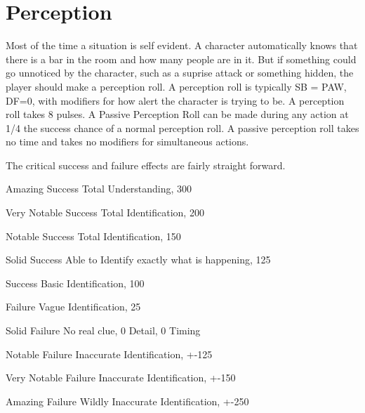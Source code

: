 \section{Perception}

Most of the time a situation is self evident. A character automatically
knows that there is a bar in the room and how many people are in it.
But if something could go unnoticed by the character, such as a suprise 
attack or something hidden, the player should make a {perception roll}. 
A perception roll is typically SB = PAW, DF=0, with modifiers for 
how alert the character is trying to be. A perception roll takes
8 pulses. A {Passive Perception Roll} can be made
during any action at 1/4 the success chance of a normal perception roll. A
passive perception roll takes no time and takes no modifiers for 
simultaneous actions.

The critical success and failure effects are fairly straight forward. 

\begin{description}
	\item Amazing Success
        Total Understanding, 300%

	\item Very Notable Success
        Total Identification, 200%

    \item Notable Success
        Total Identification, 150%

	\item Solid Success
        Able to Identify exactly what is happening, 125%

	\item Success
        Basic Identification, 100%

	\item Failure
        Vague Identification, 25%

	\item Solid Failure
        No real clue, 0 Detail, 0 Timing

	\item Notable Failure
        Inaccurate Identification, +-125%

	\item Very Notable Failure
        Inaccurate Identification, +-150%

	\item Amazing Failure
        Wildly Inaccurate Identification, +-250%
\end{description}

